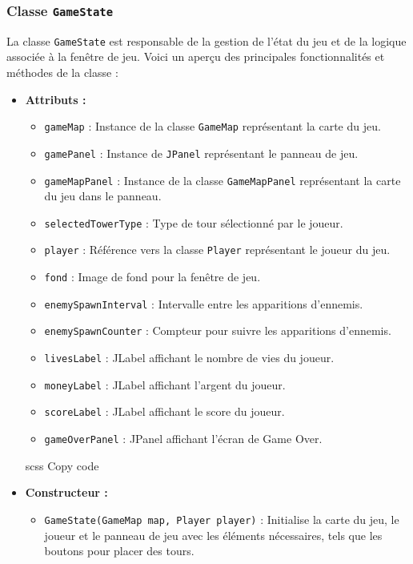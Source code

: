 \documentclass{article}
\begin{document}
\subsubsection*{Classe \texttt{GameState}}

La classe \texttt{GameState} est responsable de la gestion de l'état du jeu et de la logique associée à la fenêtre de jeu. Voici un aperçu des principales fonctionnalités et méthodes de la classe :

\begin{itemize}
\item \textbf{Attributs :}
\begin{itemize}
\item \texttt{gameMap} : Instance de la classe \texttt{GameMap} représentant la carte du jeu.
\item \texttt{gamePanel} : Instance de \texttt{JPanel} représentant le panneau de jeu.
\item \texttt{gameMapPanel} : Instance de la classe \texttt{GameMapPanel} représentant la carte du jeu dans le panneau.
\item \texttt{selectedTowerType} : Type de tour sélectionné par le joueur.
\item \texttt{player} : Référence vers la classe \texttt{Player} représentant le joueur du jeu.
\item \texttt{fond} : Image de fond pour la fenêtre de jeu.
\item \texttt{enemySpawnInterval} : Intervalle entre les apparitions d'ennemis.
\item \texttt{enemySpawnCounter} : Compteur pour suivre les apparitions d'ennemis.
\item \texttt{livesLabel} : JLabel affichant le nombre de vies du joueur.
\item \texttt{moneyLabel} : JLabel affichant l'argent du joueur.
\item \texttt{scoreLabel} : JLabel affichant le score du joueur.
\item \texttt{gameOverPanel} : JPanel affichant l'écran de Game Over.
\end{itemize}

scss
Copy code
\item \textbf{Constructeur :}
\begin{itemize}
    \item \texttt{GameState(GameMap map, Player player)} : Initialise la carte du jeu, le joueur et le panneau de jeu avec les éléments nécessaires, tels que les boutons pour placer des tours.
\end{itemize}


\end{itemize}
\end{document}
